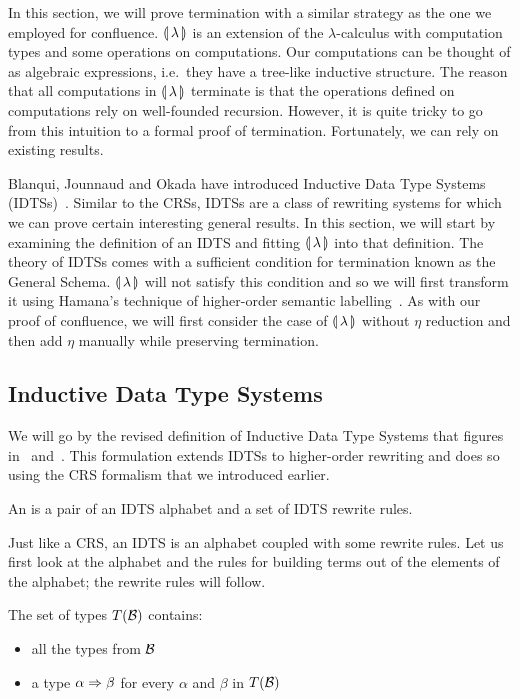 In this section, we will prove termination with a similar strategy as the
one we employed for confluence. $\llparenthesis \, \lambda \, \rrparenthesis$ is an extension of the
$\lambda$-calculus with computation types and some operations on
computations. Our computations can be thought of as algebraic expressions,
i.e.\ they have a tree-like inductive structure. The reason that all
computations in $\llparenthesis \, \lambda \, \rrparenthesis$ terminate is that the operations defined on
computations rely on well-founded recursion. However, it is quite tricky to
go from this intuition to a formal proof of termination. Fortunately, we
can rely on existing results.

Blanqui, Jounnaud and Okada have introduced Inductive Data Type Systems
(IDTSs)~\cite{blanqui2002inductive,blanqui2000termination}. Similar to the
CRSs, IDTSs are a class of rewriting systems for which we can prove certain
interesting general results. In this section, we will start by examining
the definition of an IDTS and fitting $\llparenthesis \, \lambda \, \rrparenthesis$ into that
definition. The theory of IDTSs comes with a sufficient condition for
termination known as the General Schema. $\llparenthesis \, \lambda \, \rrparenthesis$ will not satisfy this
condition and so we will first transform it using Hamana's technique of
higher-order semantic labelling~\cite{hamana2007higher}. As with our proof
of confluence, we will first consider the case of $\llparenthesis \, \lambda \, \rrparenthesis$
without $\eta$ reduction and then add $\eta$ manually while preserving
termination.


\subsection{Inductive Data Type Systems}
\label{ssec:idts}

We will go by the revised definition of Inductive Data Type Systems that
figures in~\cite{blanqui2000termination} and~\cite{hamana2007higher}. This
formulation extends IDTSs to higher-order rewriting and does so using the
CRS formalism that we introduced earlier.

\begin{definition}
  An  is a pair of an IDTS alphabet
  and a set of IDTS rewrite rules.
\end{definition}

Just like a CRS, an IDTS is an alphabet coupled with some rewrite
rules. Let us first look at the alphabet and the rules for building terms
out of the elements of the alphabet; the rewrite rules will follow.

\begin{definition}
  The set of types $T(\mathcal{B})$ contains:
  \begin{itemize}
  \item all the types from $\mathcal{B}$
  \item a type $\alpha \Rightarrow \beta$ for every $\alpha$ and $\beta$ in $T(\mathcal{B})$
  \end{itemize}
\end{definition}

